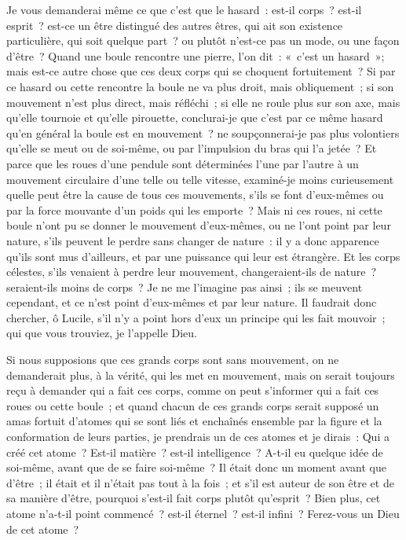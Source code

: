 \documentclass[french,twoside]{book} %
\begin{document}
Je vous demanderai même ce que c’est que le hasard : est-il corps ? est-il esprit ? est-ce un être distingué des autres êtres, qui ait son existence particulière, qui soit quelque part ? ou plutôt n’est-ce pas un mode, ou une façon d’être ? Quand une boule rencontre une pierre, l’on dit : « c’est un hasard »; mais est-ce autre chose que ces deux corps qui se choquent fortuitement ? Si par ce hasard ou cette rencontre la boule ne va plus droit, mais obliquement ; si son mouvement n’est plus direct, mais réfléchi ; si elle ne roule plus sur son axe, mais qu’elle tournoie et qu’elle pirouette, conclurai-je que c’est par ce même hasard qu’en général la boule est en mouvement ? ne soupçonnerai-je pas plus volontiers qu’elle se meut ou de soi-même, ou par l’impulsion du bras qui l’a jetée ? Et parce que les roues d’une pendule sont déterminées l’une par l’autre à un mouvement circulaire d’une telle ou telle vitesse, examiné-je moins curieusement quelle peut être la cause de tous ces mouvements, s’ils se font d’eux-mêmes ou par la force mouvante d’un poids qui les emporte ? Mais ni ces roues, ni cette boule n’ont pu se donner le mouvement d’eux-mêmes, ou ne l’ont point par leur nature, s’ils peuvent le perdre sans changer de nature : il y a donc apparence qu’ils sont mus d’ailleurs, et par une puissance qui leur est étrangère. Et les corps célestes, s’ils venaient à perdre leur mouvement, changeraient-ils de nature ? seraient-ils moins de corps ? Je ne me l’imagine pas ainsi ; ils se meuvent cependant, et ce n’est point d’eux-mêmes et par leur nature. Il faudrait donc chercher, ô Lucile, s’il n’y a point hors d’eux un principe qui les fait mouvoir ; qui que vous trouviez, je l’appelle Dieu.\par
Si nous supposions que ces grands corps sont sans mouvement, on ne demanderait plus, à la vérité, qui les met en mouvement, mais on serait toujours reçu à demander qui a fait ces corps, comme on peut s’informer qui a fait ces roues ou cette boule ; et quand chacun de ces grands corps serait supposé un amas fortuit d’atomes qui se sont liés et enchaînés ensemble par la figure et la conformation de leurs parties, je prendrais un de ces atomes et je dirais : Qui a créé cet atome ? Est-il matière ? est-il intelligence ? A-t-il eu quelque idée de soi-même, avant que de se faire soi-même ? Il était donc un moment avant que d’être ; il était et il n’était pas tout à la fois ; et s’il est auteur de son être et de sa manière d’être, pourquoi s’est-il fait corps plutôt qu’esprit ? Bien plus, cet atome n’a-t-il point commencé ? est-il éternel ? est-il infini ? Ferez-vous un Dieu de cet atome ?\par
\end{document}
